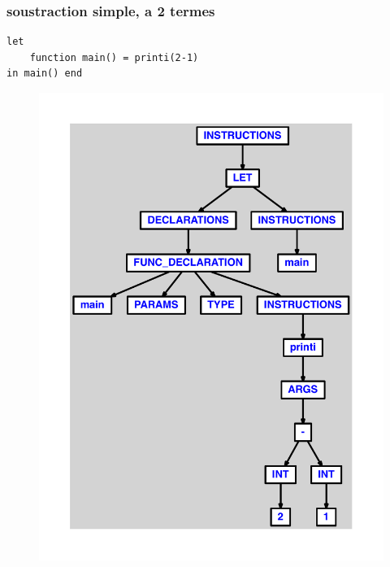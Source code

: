 \documentclass{article}
\begin{document}
\subsubsection{soustraction simple, a 2 termes}
\begin{lstlisting}
let
	function main() = printi(2-1)
in main() end
\end{lstlisting}
\newpage
\begin{figure}[H]
\centering
\includegraphics[max width=\textwidth]{ast/ast_40.pdf}
\end{figure}
\newpage
\end{document}
